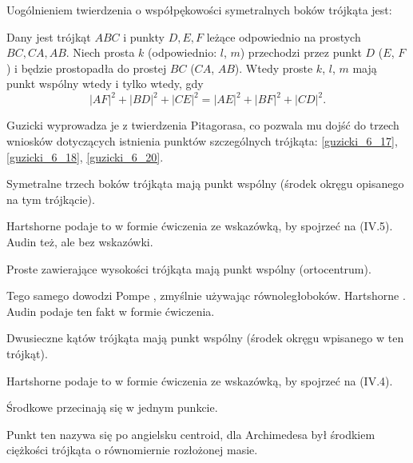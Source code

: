 %

Uogólnieniem twierdzenia o współpękowości symetralnych boków trójkąta jest:

\begin{proposition}
\label{guzicki_6_13}%
	Dany jest trójkąt $ABC$ i punkty $D, E, F$ leżące odpowiednio na prostych $BC, CA, AB$.
	Niech prosta $k$ (odpowiednio: $l$, $m$) przechodzi przez punkt $D$ ($E$, $F$) i będzie prostopadła do prostej $BC$ ($CA$, $AB$).
	Wtedy proste $k$, $l$, $m$ mają punkt wspólny wtedy i tylko wtedy, gdy
	\begin{equation}
		|AF|^2 + |BD|^2 + |CE|^2 = |AE|^2 + |BF|^2 + |CD|^2.
	\end{equation}
\end{proposition}

Guzicki \cite[s. 176]{guzicki_2021} wyprowadza je z twierdzenia Pitagorasa, co pozwala mu dojść do trzech wniosków dotyczących istnienia punktów szczególnych trójkąta: \ref{guzicki_6_17}, \ref{guzicki_6_18}, \ref{guzicki_6_20}.

\begin{corollary}
\label{guzicki_6_17}%
    Symetralne trzech boków trójkąta mają punkt wspólny (środek okręgu opisanego na tym trójkącie).
\end{corollary}

Hartshorne \cite[s. 16]{hartshorne2000} podaje to w formie ćwiczenia ze wskazówką, by spojrzeć na (IV.5).
Audin \cite[s. 61]{audin_2003} też, ale bez wskazówki.

\begin{corollary}
\label{guzicki_6_18}%
    Proste zawierające wysokości trójkąta mają punkt wspólny (ortocentrum).
%
\end{corollary}

Tego samego dowodzi Pompe \cite[s. 38]{pompe_2022}, zmyślnie używając równoległoboków.
Hartshorne \cite[s. 54]{hartshorne2000}.
Audin \cite[s. 61]{audin_2003} podaje ten fakt w formie ćwiczenia.

\begin{corollary} %
\label{guzicki_6_20}%
    Dwusieczne kątów trójkąta mają punkt wspólny (środek okręgu wpisanego w ten trójkąt).
\end{corollary}

Hartshorne \cite[s. 16]{hartshorne2000} podaje to w formie ćwiczenia ze wskazówką, by spojrzeć na (IV.4).

Środkowe przecinają się w jednym punkcie. %

Punkt ten nazywa się po angielsku centroid, dla Archimedesa był środkiem ciężkości trójkąta o równomiernie rozłożonej masie.

%